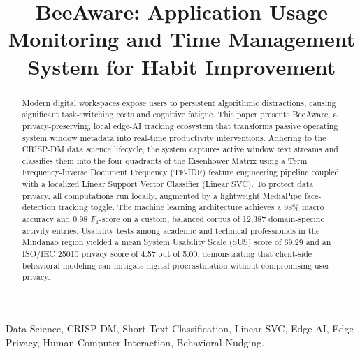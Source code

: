 \documentclass[conference]{IEEEtran}
\begin{document}
\title{BeeAware: Application Usage Monitoring and Time Management System for Habit Improvement}

\author{
}

\maketitle

\begin{abstract}
Modern digital workspaces expose users to persistent algorithmic distractions, causing significant task-switching costs and cognitive fatigue. This paper presents BeeAware, a privacy-preserving, local edge-AI tracking ecosystem that transforms passive operating system window metadata into real-time productivity interventions. Adhering to the CRISP-DM data science lifecycle, the system captures active window text streams and classifies them into the four quadrants of the Eisenhower Matrix using a Term Frequency-Inverse Document Frequency (TF-IDF) feature engineering pipeline coupled with a localized Linear Support Vector Classifier (Linear SVC). To protect data privacy, all computations run locally, augmented by a lightweight MediaPipe face-detection tracking toggle. The machine learning architecture achieves a 98\% macro accuracy and 0.98 $F_1$-score on a custom, balanced corpus of 12,387 domain-specific activity entries. Usability tests among academic and technical professionals in the Mindanao region yielded a mean System Usability Scale (SUS) score of 69.29 and an ISO/IEC 25010 privacy score of 4.57 out of 5.00, demonstrating that client-side behavioral modeling can mitigate digital procrastination without compromising user privacy.
\end{abstract}

\begin{IEEEkeywords}
Data Science, CRISP-DM, Short-Text Classification, Linear SVC, Edge AI, Edge Privacy, Human-Computer Interaction, Behavioral Nudging.
\end{IEEEkeywords}

\end{document}
